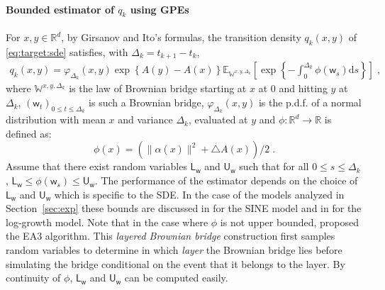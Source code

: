\documentclass[12pt]{article}
\newcommand{\rmd}{\mathrm{d}}
\newcommand{\eqsp}{\;}
\newcommand{\1}{\mathrm{1}}
\newcommand{\mw}{\mathsf{w}}%
\newcommand{\U}{\mathsf{U}}
\newcommand{\Lo}{\mathsf{L}}
\begin{document}
\paragraph{Bounded estimator of $q_k$ using GPEs}
For $x, y \in \mathbb{R}^d$, by Girsanov and Ito's formulas, the transition density $q_k(x,y)$ of \eqref{eq:target:sde} satisfies, with $\Delta_k = t_{k+1}-t_k$,
\begin{align*}
q_k(x,y)=\varphi_{\Delta_k}(x,y)\exp\left\lbrace A(y)-A(x)\right\rbrace \mathbb{E}_{\mathbb{W}^{x,y,\Delta_k}}\left[ \exp \left\lbrace - \int_0^{\Delta_k} \phi(\mw_s)\rmd s \right\rbrace \right]\eqsp,
\end{align*}
where $\mathbb{W}^{x,y,\Delta_k}$ is the law of Brownian bridge starting at $x$ at 0 and hitting $y$ at $\Delta_k$, $(\mw_t)_{0\leq t \leq \Delta_k}$ is such a Brownian bridge, $\varphi_{\Delta_k}(x,y)$ is the p.d.f. of a normal distribution with mean $x$ and variance $\Delta_k$, evaluated at $y$ and $\phi:\mathbb{R}^d\to\mathbb{R}$ is defined as:
\[
\phi(x) =\left(\|\alpha(x)\|^2  + \triangle A(x)\right)/2\eqsp.
\]
Assume that there exist random variables $\Lo_\mw$ and $\U_\mw$ such that for all $0\leq s \leq \Delta_k$, $\Lo_\mw \leq \phi(\mw_s)\leq \U_\mw$. The performance of the estimator depends on the choice of $\Lo_\mw$ and $\U_\mw$ which is specific to the SDE. In the case of the models analyzed in Section~\ref{sec:exp} these bounds are discussed in \cite{fearnhead:papaspiliopoulos:roberts:2008} for the SINE model and in \cite{olsson:strojby:2011} for the log-growth model. Note that in the case where $\phi$ is not upper bounded, \cite{beskos:papaspiliopoulos:roberts:2008} proposed the EA3 algorithm. This {\em layered Brownian bridge} construction first samples random variables to determine in which {\em layer} the Brownian bridge lies before simulating the bridge conditional on the event that it belongs to the layer. By continuity of $\phi$, $\Lo_\mw$ and  $\U_\mw$ can be computed easily. 
\end{document}
